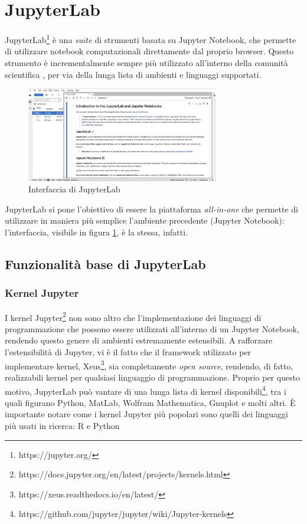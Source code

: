 \section{JupyterLab}
JupyterLab\footnote{https://jupyter.org/} è una \textit{suite} di strumenti basata su Jupyter Notebook, che permette di utilizzare notebook computazionali direttamente dal proprio browser. Questo strumento è incrementalmente sempre più utilizzato all'interno della comunità scientifica \cite{perkel2018jupyter}, per via della lunga lista di ambienti e linguaggi supportati.
\begin{figure}[h]
    \centering
    \includegraphics[width=0.75\textwidth]{images/jupyter-hub-1.png}
    \caption{Interfaccia di JupyterLab}
    \label{fig:jupyter-interface-1}
\end{figure}
\newline
JupyterLab si pone l'obiettivo di essere la piattaforma \textit{all-in-one} che permette di utilizzare in maniera più semplice l'ambiente precedente (Jupyter Notebook): l'interfaccia, visibile in figura \ref{fig:jupyter-interface-1}, è la stessa, infatti. 
\subsection{Funzionalità base di JupyterLab}
\subsubsection{Kernel Jupyter}
I kernel Jupyter\footnote{https://docs.jupyter.org/en/latest/projects/kernels.html} non sono altro che l'implementazione dei linguaggi di programmazione che possono essere utilizzati all'interno di un Jupyter Notebook, rendendo questo genere di ambienti estremamente estensibili. A rafforzare l'estensibilità di Jupyter, vi è il fatto che il framework utilizzato per implementare kernel, Xeus\footnote{https://xeus.readthedocs.io/en/latest/}, sia completamente \textit{open source}, rendendo, di fatto, realizzabili kernel per qualsiasi linguaggio di programmazione. Proprio per questo motivo, JupyterLab può vantare di una lunga lista di kernel disponibili\footnote{https://github.com/jupyter/jupyter/wiki/Jupyter-kernels}, tra i quali figurano Python, MatLab, Wolfram Mathematica, Gnuplot e molti altri.
\newline
È importante notare come i kernel Jupyter più popolari sono quelli dei linguaggi più usati in ricerca\cite{kluyver2016jupyter}: R e Python
